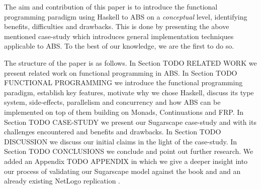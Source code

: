 The aim and contribution of this paper is to introduce the functional programming paradigm using Haskell to ABS on a \textit{conceptual} level, identifying benefits, difficulties and drawbacks. This is done by presenting the above mentioned case-study which introduces general implementation techniques applicable to ABS. To the best of our knowledge, we are the first to do so.

The structure of the paper is as follows. 
In Section TODO RELATED WORK we present related work on functional programming in ABS. 
In Section TODO FUNCTIONAL PROGRAMMING we introduce the functional programming paradigm, establish key features, motivate why we chose Haskell, discuss its type system, side-effects, parallelism and concurrency and how ABS can be implemented on top of them building on Monads, Continuations and FRP. 
In Section TODO CASE-STUDY we present our Sugarscape case-study and with its challenges encountered and benefits and drawbacks.
In Section TODO DISCUSSION we discuss our initial claims in the light of the case-study.
In Section TODO CONCLUSIONS we conclude and point out further research.
We added an Appendix TODO APPENDIX in which we give a deeper insight into our process of validating our Sugarscape model against the book and \cite{epstein_growing_1996} and an already existing NetLogo replication \cite{weaver_replicating_nodate}.